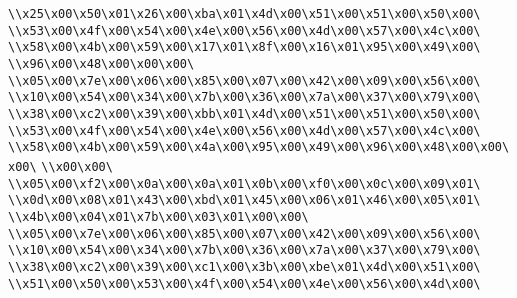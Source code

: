 \verb|\\x25\x00\x50\x01\x26\x00\xba\x01\x4d\x00\x51\x00\x51\x00\x50\x00\|\newline
\verb|\\x53\x00\x4f\x00\x54\x00\x4e\x00\x56\x00\x4d\x00\x57\x00\x4c\x00\|\newline
\verb|\\x58\x00\x4b\x00\x59\x00\x17\x01\x8f\x00\x16\x01\x95\x00\x49\x00\|\newline
\verb|\\x96\x00\x48\x00\x00\x00\|\newline
\verb|\\x05\x00\x7e\x00\x06\x00\x85\x00\x07\x00\x42\x00\x09\x00\x56\x00\|\newline
\verb|\\x10\x00\x54\x00\x34\x00\x7b\x00\x36\x00\x7a\x00\x37\x00\x79\x00\|\newline
\verb|\\x38\x00\xc2\x00\x39\x00\xbb\x01\x4d\x00\x51\x00\x51\x00\x50\x00\|\newline
\verb|\\x53\x00\x4f\x00\x54\x00\x4e\x00\x56\x00\x4d\x00\x57\x00\x4c\x00\|\newline
\verb|\\x58\x00\x4b\x00\x59\x00\x4a\x00\x95\x00\x49\x00\x96\x00\x48\x00\x00\x00\|\newline
\verb|\\x00\x00\|\newline
\verb|\\x05\x00\xf2\x00\x0a\x00\x0a\x01\x0b\x00\xf0\x00\x0c\x00\x09\x01\|\newline
\verb|\\x0d\x00\x08\x01\x43\x00\xbd\x01\x45\x00\x06\x01\x46\x00\x05\x01\|\newline
\verb|\\x4b\x00\x04\x01\x7b\x00\x03\x01\x00\x00\|\newline
\verb|\\x05\x00\x7e\x00\x06\x00\x85\x00\x07\x00\x42\x00\x09\x00\x56\x00\|\newline
\verb|\\x10\x00\x54\x00\x34\x00\x7b\x00\x36\x00\x7a\x00\x37\x00\x79\x00\|\newline
\verb|\\x38\x00\xc2\x00\x39\x00\xc1\x00\x3b\x00\xbe\x01\x4d\x00\x51\x00\|\newline
\verb|\\x51\x00\x50\x00\x53\x00\x4f\x00\x54\x00\x4e\x00\x56\x00\x4d\x00\|\newline
